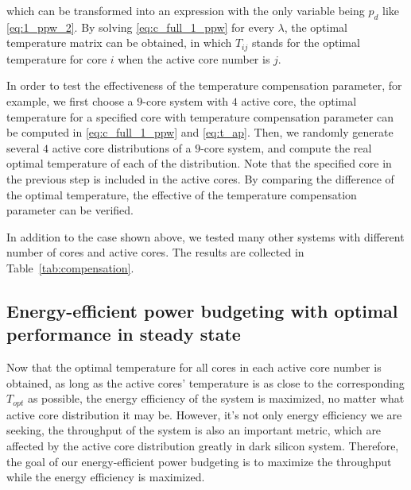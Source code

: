 which can be transformed into an expression with the only variable being $p_{d}$ like \eqref{eq:1_ppw_2}. By solving \eqref{eq:c_full_1_ppw} for every $\lambda$, the optimal temperature matrix can be obtained, in which $T_{ij}$ stands for the optimal temperature for core $i$ when the active core number is $j$.

In order to test the effectiveness of the temperature compensation parameter, for example, we first choose a $9$-core system with $4$ active core, the optimal temperature for a specified core with temperature compensation parameter can be computed in \eqref{eq:c_full_1_ppw} and \eqref{eq:t_ap}. Then, we randomly generate several $4$ active core distributions of a $9$-core system, and compute the real optimal temperature of each of the distribution. Note that the specified core in the previous step is included in the active cores. By comparing the difference of the optimal temperature, the effective of the temperature compensation parameter can be verified.

In addition to the case shown above, we tested many other systems with different number of cores and active cores. The results are collected in Table~\ref{tab:compensation}.


\subsection{Energy-efficient power budgeting with optimal performance in steady state}
Now that the optimal temperature for all cores in each active core number is obtained, as long as the active cores' temperature is as close to the corresponding $T_{opt}$ as possible, the energy efficiency of the system is maximized, no matter what active core distribution it may be. However, it's not only energy efficiency we are seeking, the throughput of the system is also an important metric, which are affected by the active core distribution greatly in dark silicon system. Therefore, the goal of our energy-efficient power budgeting is to maximize the throughput while the energy efficiency is maximized.

